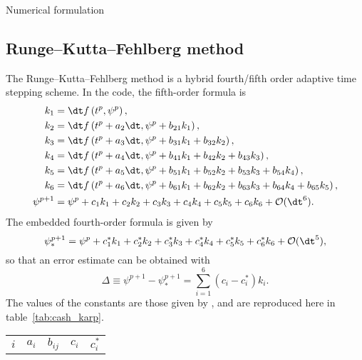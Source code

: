 \begin{chapter}{\label{cha:numerics}Numerical formulation}
  \subsection{Runge--Kutta--Fehlberg method}
  The Runge--Kutta--Fehlberg method is a hybrid fourth/fifth order adaptive
  time stepping scheme.  In the code, the fifth-order formula is
  \begin{equation*}
    \begin{aligned}
      k_{1} &= \dt f\left( t^{p}, \psi^{p} \right), \\
      k_{2} &= \dt f\left( t^{p} + a_{2}\dt, \psi^{p} + b_{21} k_{1}
        \right), \\
      k_{3} &= \dt f\left( t^{p} + a_{3}\dt, \psi^{p} + b_{31} k_{1} + b_{32}
        k_{2} \right), \\
      k_{4} &= \dt f\left( t^{p} + a_{4}\dt, \psi^{p} + b_{41} k_{1} + b_{42}
        k_{2} + b_{43} k_{3} \right), \\
      k_{5} &= \dt f\left( t^{p} + a_{5}\dt, \psi^{p} + b_{51} k_{1} + b_{52}
        k_{2} + b_{53} k_{3} + b_{54} k_{4} \right), \\
      k_{6} &= \dt f\left( t^{p} + a_{6}\dt, \psi^{p} + b_{61} k_{1} + b_{62}
        k_{2} + b_{63} k_{3} + b_{64} k_{4} + b_{65} k_{5} \right), \\
      \psi^{p+1} &= \psi^{p} + c_{1} k_{1} + c_{2} k_{2} + c_{3} k_{3} + c_{4}
        k_{4} + c_{5} k_{5} + c_{6} k_{6} + \mathcal{O}(\dt^{6}).
    \end{aligned}
  \end{equation*}
  The embedded fourth-order formula is given by
  \begin{equation*}
    \psi_{*}^{p+1} = \psi^{p} + c_{1}^{*} k_{1} + c_{2}^{*} k_{2} + c_{3}^{*}
    k_{3} + c_{4}^{*} k_{4} + c_{5}^{*} k_{5} + c_{6}^{*} k_{6} +
    \mathcal{O}(\dt^{5}),
  \end{equation*}
  so that an error estimate can be obtained with
  \begin{equation*}
    \Delta \equiv \psi^{p+1} - \psi_{*}^{p+1} = \sum_{i=1}^{6}{\left( c_{i} -
    c_{i}^{*} \right) k_{i}}.
  \end{equation*}
  The values of the constants are those given by \citet{CK90}, and are
  reproduced here in table~\ref{tab:cash_karp}.
  \begin{table}
    \renewcommand{\arraystretch}{1.5}
    \centering
    \begin{tabular}{|c|c|ccccc|c|c|}
      \hline
      $i$ & $a_{i}$ & \multicolumn{5}{c|}{$b_{ij}$} & $c_{i}$ & $c_{i}^{*}$ \\

\end{tabular}
\end{table}
\end{chapter}

